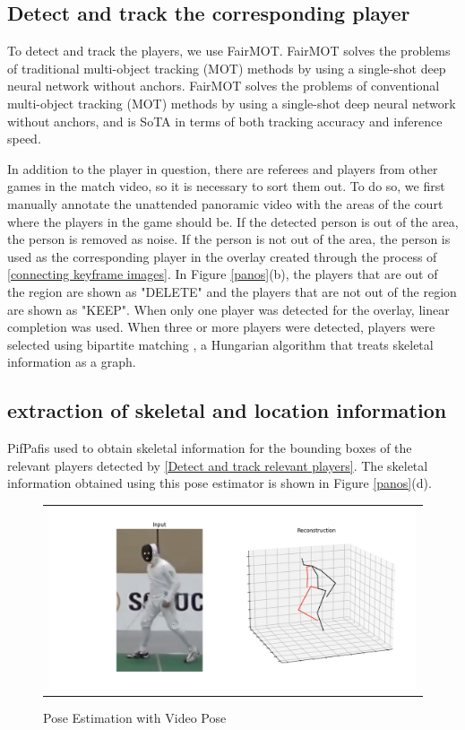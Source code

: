{\subsection{Detect and track the corresponding player}\label{Detect and track the corresponding player}
To detect and track the players, we use FairMOT\cite{zhang2020fair}. FairMOT solves the problems of traditional multi-object tracking (MOT) methods by using a single-shot deep neural network without anchors. FairMOT solves the problems of conventional multi-object tracking (MOT) methods by using a single-shot deep neural network without anchors, and is SoTA in terms of both tracking accuracy and inference speed.

In addition to the player in question, there are referees and players from other games in the match video, so it is necessary to sort them out. To do so, we first manually annotate the unattended panoramic video with the areas of the court where the players in the game should be.
If the detected person is out of the area, the person is removed as noise. If the person is not out of the area, the person is used as the corresponding player in the overlay created through the process of \ref{connecting keyframe images}. In Figure \ref{panos}(b), the players that are out of the region are shown as "DELETE" and the players that are not out of the region are shown as "KEEP". When only one player was detected for the overlay, linear completion was used. When three or more players were detected, players were selected using bipartite matching \cite{kuhn1955hungarian}, a Hungarian algorithm that treats skeletal information as a graph.

\subsection{extraction of skeletal and location information}
PifPaf\cite{Kreiss_2019}is used to obtain skeletal information for the bounding boxes of the relevant players detected by \ref{Detect and track relevant players}. The skeletal information obtained using this pose estimator is shown in Figure \ref{panos}(d).


\begin{figure}[!hb]
	\begin{tabular}{c}
		\includegraphics[width = 0.8\linewidth]{images/fencing/videopose.png}
	\end{tabular}
	\caption{Pose Estimation with Video Pose}
	\label{videopose}
\end{figure}


}
